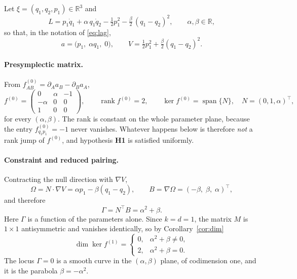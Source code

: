 \documentclass[12pt]{article}
\theoremstyle{plain}
\theoremstyle{definition}
\theoremstyle{remark}
\newcommand{\R}{\mathbb{R}}
\DeclareMathOperator{\rank}{rank}
\DeclareMathOperator{\spn}{span}
\newcommand{\pd}[1]{\partial_{#1}}
\newcommand{\Om}{\Omega}
\begin{document}
	Let $\xi=(q_{1},q_{2},p_{1})\in\R^{3}$ and
	\begin{equation}
		L=p_{1}\dot q_{1}+\alpha\,q_{1}\dot q_{2}
		-\tfrac12 p_{1}^{2}-\tfrac{\beta}{2}\,(q_{1}-q_{2})^{2},
		\qquad \alpha,\beta\in\R,
		\label{eq:pgL}
	\end{equation}
	so that, in the notation of \eqref{eq:lag},
	\begin{equation}
		a=\bigl(p_{1},\;\alpha q_{1},\;0\bigr),
		\qquad
		V=\tfrac12 p_{1}^{2}+\tfrac{\beta}{2}(q_{1}-q_{2})^{2}.
		\label{eq:pgaV}
	\end{equation}
	
	\paragraph{Presymplectic matrix.} From $f^{(0)}_{AB}=\pd{A}a_{B}-\pd{B}a_{A}$,
	\begin{equation}
		f^{(0)}=\begin{pmatrix}0&\alpha&-1\\ -\alpha&0&0\\ 1&0&0\end{pmatrix},
		\qquad
		\rank f^{(0)}=2,
		\qquad
		\ker f^{(0)}=\spn\{N\},\quad N=(0,1,\alpha)^{\top},
		\label{eq:pgf0}
	\end{equation}
	for every $(\alpha,\beta)$. The rank is constant on the whole parameter plane,
	because the entry $f^{(0)}_{q_{1}p_{1}}=-1$ never vanishes. Whatever happens
	below is therefore \emph{not} a rank jump of $f^{(0)}$, and hypothesis
	\textbf{H1} is satisfied uniformly.
	
	\paragraph{Constraint and reduced pairing.} Contracting the null direction with
	$\nabla V$,
	\begin{equation}
		\Om=N\!\cdot\!\nabla V=\alpha p_{1}-\beta(q_{1}-q_{2}),
		\qquad
		B=\nabla\Om=(-\beta,\;\beta,\;\alpha)^{\top},
		\label{eq:pgOm}
	\end{equation}
	and therefore
	\begin{equation}
		\Gamma=N^{\top}B=\alpha^{2}+\beta .
		\label{eq:pgGamma}
	\end{equation}
	Here $\Gamma$ is a function of the parameters alone. Since $k=d=1$, the matrix
	$M$ is $1\times1$ antisymmetric and vanishes identically, so by
	Corollary~\ref{cor:dim}
	\begin{equation}
		\dim\ker f^{(1)}
		=\begin{cases}
			0, & \alpha^{2}+\beta\neq0,\\[0.2em]
			2, & \alpha^{2}+\beta=0 .
		\end{cases}
		\label{eq:pgdim}
	\end{equation}
	The locus $\Gamma=0$ is a smooth curve in the $(\alpha,\beta)$ plane, of
	codimension one, and it is the parabola $\beta=-\alpha^{2}$.
	
\end{document}
